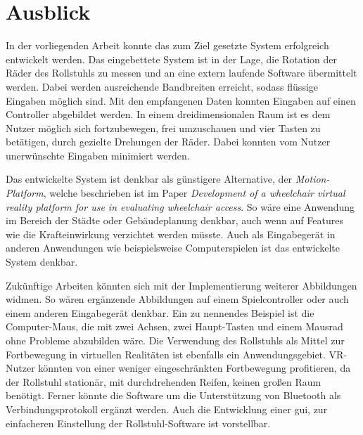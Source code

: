 \chapter{Ausblick}
In der vorliegenden Arbeit konnte das zum Ziel gesetzte System erfolgreich entwickelt werden.
Das eingebettete System ist in der Lage, die Rotation der Räder des Rollstuhls zu messen und an eine extern laufende Software übermittelt werden.
Dabei werden ausreichende Bandbreiten erreicht, sodass flüssige Eingaben möglich sind.
Mit den empfangenen Daten konnten Eingaben auf einen Controller abgebildet werden.
In einem dreidimensionalen Raum ist es dem Nutzer möglich sich fortzubewegen, frei umzuschauen und vier Tasten zu betätigen, durch gezielte Drehungen der Räder.
Dabei konnten vom Nutzer unerwünschte Eingaben minimiert werden.

Das entwickelte System ist denkbar als günstigere Alternative, der \textit{Motion-Platform}, welche beschrieben ist im Paper \textit{Development of a wheelchair virtual reality platform for use in evaluating wheelchair access}\cite{harrisionDevelopmentWheelchairVirtual2000}.
So wäre eine Anwendung im Bereich der Städte oder Gebäudeplanung denkbar, auch wenn auf Features wie die Krafteinwirkung verzichtet werden müsste.
Auch als Eingabegerät in anderen Anwendungen wie beispielsweise Computerspielen ist das entwickelte System denkbar.

Zukünftige Arbeiten könnten sich mit der Implementierung weiterer Abbildungen widmen.
So wären ergänzende Abbildungen auf einem Spielcontroller oder auch einem anderen Eingabegerät denkbar.
Ein zu nennendes Beispiel ist die Computer-Maus, die mit zwei Achsen, zwei Haupt-Tasten und einem Mausrad ohne Probleme abzubilden wäre.
Die Verwendung des Rollstuhls als Mittel zur Fortbewegung in virtuellen Realitäten ist ebenfalls ein Anwendungsgebiet.
VR-Nutzer könnten von einer weniger eingeschränkten Fortbewegung profitieren, da der Rollstuhl stationär, mit durchdrehenden Reifen, keinen großen Raum benötigt.
Ferner könnte die Software um die Unterstützung von Bluetooth als Verbindungsprotokoll ergänzt werden.
Auch die Entwicklung einer \ac{gui}, zur einfacheren Einstellung der Rollstuhl-Software ist vorstellbar.